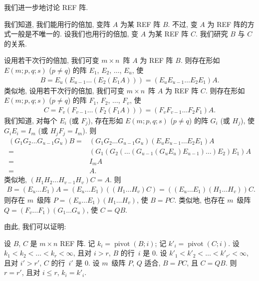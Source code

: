 \documentclass[../libro.tex]{subfiles}
\begin{document}
我们进一步地讨论 REF 阵.

我们知道, 我们能用行的倍加, 变阵 \(A\) 为某 REF 阵 \(B\).
不过, 变 \(A\) 为 REF 阵的方式一般是不唯一的.
设我们也用行的倍加, 变 \(A\) 为某 REF 阵 \(C\).
我们研究 \(B\) 与 \(C\) 的关系.

设用若干次行的倍加, 我们可变 \(m \times n\)~阵 \(A\)
为 REF 阵 \(B\).
则存在形如 \(E(m; p, q; s)\) (\(p \neq q\)) 的阵
\(E_1\), \(E_2\), \(\dots\), \(E_u\),
使
\begin{align*}
    B
    = E_u (E_{u-1} \dots (E_2 (E_1 A)))
    = (E_u E_{u-1} \dots E_2 E_1) A.
\end{align*}
类似地,
设用若干次行的倍加, 我们可变 \(m \times n\)~阵 \(A\)
为 REF 阵 \(C\).
则存在形如 \(E(m; p, q; s)\) (\(p \neq q\)) 的阵
\(F_1\), \(F_2\), \(\dots\), \(F_v\),
使
\begin{align*}
    C
    = F_v (F_{v-1} \dots (F_2 (F_1 A)))
    = (F_v F_{v-1} \dots F_2 F_1) A.
\end{align*}
我们知道, 对每个 \(E_i\) (或 \(F_j\)),
存在形如 \(E(m; p, q; s)\) (\(p \neq q\)) 的阵
\(G_i\) (或 \(H_j\)),
使 \(G_i E_i = I_m\)
(或 \(H_j F_j = I_m\)).
则
\begin{align*}
    (G_1 G_2 \dots G_{u-1} G_u) B
    = {} &
    (G_1 G_2 \dots G_{u-1} G_u)
    (E_u E_{u-1} \dots E_2 E_1) A
    \\
    = {} &
    (G_1 (G_2 (\dots (G_{u-1} (G_u E_u) E_{u-1}) \dots) E_2) E_1)
    A
    \\
    = {} &
    I_m A
    \\
    = {} &
    A.
\end{align*}
类似地, \((H_1 H_2 \dots H_{v-1} H_v) C = A\).
则
\begin{align*}
    B
    = (E_u \dots E_1) A
    = (E_u \dots E_1) ((H_1 \dots H_v) C)
    = ((E_u \dots E_1) (H_1 \dots H_v)) C.
\end{align*}
则存在 \(m\)~级阵 \(P = (E_u \dots E_1) (H_1 \dots H_v)\),
使 \(B = P C\).
类似地, 也存在 \(m\)~级阵
\(Q = (F_v \dots F_1) (G_1 \dots G_u)\),
使 \(C = Q B\).

由此, 我们可以证明:

\begin{theorem}
    设 \(B\), \(C\) 是 \(m \times n\) REF 阵.
    记 \(k_i = \operatorname{pivot} {(B; i)}\);
    记 \(k'_i = \operatorname{pivot} {(C; i)}\).
    设 \(k_1 < k_2 < \dots < k_r < \infty\),
    且对 \(i > r\), \(B\) 的行~\(i\) 是 \(0\).
    设 \(k'_1 \allowbreak
        < k'_2 \allowbreak
        < \dots \allowbreak
        < k'_{r'} \allowbreak
    < \infty\),
    且对 \(i' > r'\), \(C\) 的行~\(i'\) 是 \(0\).
    设 \(m\)~级阵 \(P\), \(Q\) 适合,
    \(B = PC\), 且 \(C = QB\).
    则 \(r = r'\),
    且对 \(i \leq r\),
    \(k_i = k'_i\).
\end{theorem}
\end{document}
